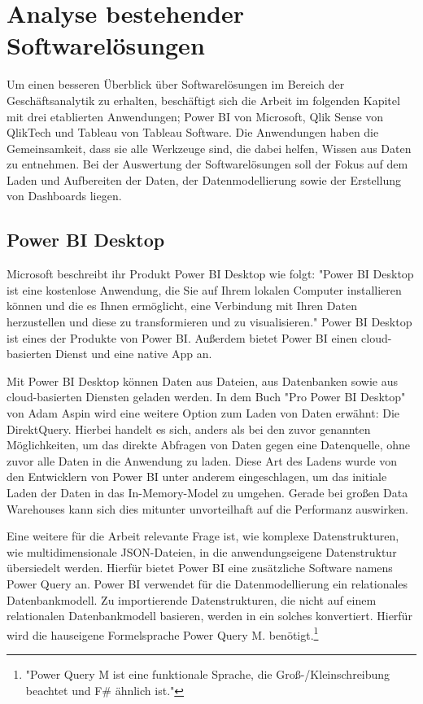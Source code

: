 \chapter{Analyse bestehender Softwarelösungen}
\label{chap:analysebestehendersoftwareloesungen}

Um einen besseren Überblick über Softwarelösungen im Bereich der Geschäftsanalytik zu erhalten, beschäftigt sich
die Arbeit im folgenden Kapitel mit drei etablierten Anwendungen; Power BI von
Microsoft, Qlik Sense von QlikTech und Tableau von Tableau Software.
Die Anwendungen haben die Gemeinsamkeit, dass sie alle Werkzeuge sind,
die dabei helfen, Wissen aus Daten zu entnehmen. Bei der Auswertung
der Softwarelösungen soll der Fokus auf dem Laden und Aufbereiten der Daten,
der Datenmodellierung sowie der Erstellung von Dashboards liegen.

\section{Power BI Desktop}
\label{sec:powerbidesktop}

Microsoft beschreibt ihr Produkt Power BI Desktop wie folgt: "Power BI Desktop ist eine kostenlose Anwendung,
die Sie auf Ihrem lokalen Computer installieren können und die es Ihnen ermöglicht, eine Verbindung mit Ihren
Daten herzustellen und diese zu transformieren und zu visualisieren."\cite{MicrosoftPowerBIDesktopDocs}
Power BI Desktop ist eines der Produkte von Power BI. Außerdem bietet Power BI einen cloud-basierten Dienst
und eine native App an.\cite{WikiPowerBI}

Mit Power BI Desktop können Daten aus Dateien, aus Datenbanken sowie
aus cloud-basierten Diensten geladen werden. In dem Buch "Pro Power BI Desktop"
von Adam Aspin wird eine weitere Option zum Laden von Daten erwähnt: Die DirektQuery.
Hierbei handelt es sich, anders als bei den zuvor genannten Möglichkeiten, um das direkte
Abfragen von Daten gegen eine Datenquelle, ohne zuvor alle Daten in die Anwendung zu laden.\cite[S. 111]{ProPowerBIDesktop}
Diese Art des Ladens wurde von den Entwicklern von Power BI unter anderem eingeschlagen,
um das initiale Laden der Daten in das In-Memory-Model zu umgehen. Gerade bei großen Data Warehouses
kann sich dies mitunter unvorteilhaft auf die Performanz auswirken.

Eine weitere für die Arbeit relevante Frage ist, wie komplexe Datenstrukturen, wie multidimensionale JSON-Dateien,
in die anwendungseigene Datenstruktur übersiedelt werden. Hierfür bietet Power BI eine zusätzliche Software
namens Power Query an. Power BI verwendet für die Datenmodellierung ein relationales Datenbankmodell.\cite[S. 319]{ProPowerBIDesktop}
Zu importierende Datenstrukturen, die nicht auf einem relationalen Datenbankmodell basieren, werden
in ein solches konvertiert. Hierfür wird die hauseigene Formelsprache Power Query M. benötigt.\footnote{"Power Query M ist eine funktionale Sprache,
die Groß-/Kleinschreibung beachtet und F\# ähnlich ist."\cite{MicrosoftDocsPowerQueryFormelsprache}}

